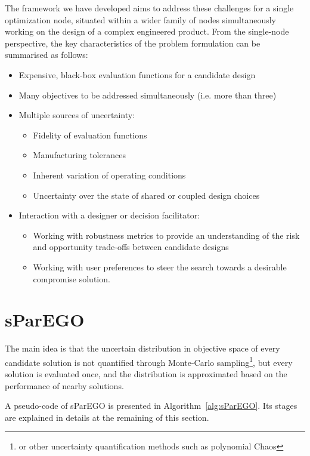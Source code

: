 \documentclass[10pt]{llncs}
\begin{document}
The framework we have developed aims to address these challenges for a single optimization node, situated within a wider family of nodes simultaneously working on the design of a complex engineered product. From the single-node perspective, the key characteristics of the problem formulation can be summarised as follows: 
\begin{itemize}
	\item Expensive, black-box evaluation functions for a candidate design
	\item Many objectives to be addressed simultaneously (i.e. more than three)
	\item Multiple sources of uncertainty:
		\begin{itemize}
			\item Fidelity of evaluation functions
			\item Manufacturing tolerances
			\item Inherent variation of operating conditions
			\item Uncertainty over the state of shared or coupled design choices
		\end{itemize}
	\item Interaction with a designer or decision facilitator:
		\begin{itemize}
			\item Working with robustness metrics to provide an understanding of the risk and 						  opportunity trade-offs between candidate designs
			\item Working with user preferences to steer the search towards a desirable 				 	 		  compromise solution.
		\end{itemize}
\end{itemize}


\section{sParEGO}
The main idea is that the uncertain distribution in objective space of every candidate solution is not quantified through Monte-Carlo sampling\footnote{or other uncertainty quantification methods such as polynomial Chaos}, but every solution is evaluated once, and the distribution is approximated based on the performance of nearby solutions.

A pseudo-code of sParEGO is presented in Algorithm~\ref{alg:sParEGO}.
Its stages are explained in details at the remaining of this section.
\end{document}
